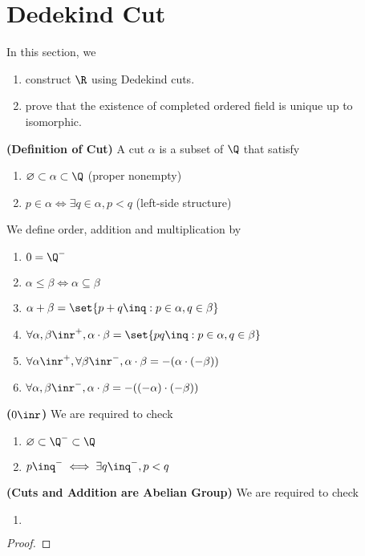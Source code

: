 \documentclass{report}
\begin{document}
\section{Dedekind Cut}
\begin{mdframed}
In this section, we  
\begin{enumerate}[label=(\alph*)]
  \item construct $\R$ using Dedekind cuts.   
  \item prove that the existence of completed ordered field is unique up to isomorphic. 
\end{enumerate}
\end{mdframed}
\begin{definition}
\textbf{(Definition of Cut)} A cut $\alpha $ is a subset of $\Q$ that satisfy 
\begin{enumerate}[label=(\alph*)]
  \item $\varnothing \subset \alpha \subset \Q$ (proper nonempty)
  \item  $p\in \alpha \iff  \exists q \in \alpha ,p<q$ (left-side structure)
\end{enumerate}
We define order, addition and multiplication by 
\begin{enumerate}[label=(\alph*)]
  \item $0=\Q^-$
  \item $\alpha \leq \beta \iff \alpha \subseteq \beta$ 
  \item $\alpha +\beta =\set{p+q\inq: p\in  \alpha ,q \in \beta }$ 
  \item $\forall \alpha ,\beta\inr^+,\alpha \cdot \beta=\set{pq\inq:p\in \alpha ,q\in \beta } $ 
  \item $\forall \alpha \inr^+,\forall \beta \inr^-, \alpha \cdot \beta = - (\alpha \cdot (-\beta ))$
  \item $\forall \alpha ,\beta \inr^-, \alpha \cdot \beta  =-((-\alpha )\cdot (-\beta ))$
\end{enumerate}
\end{definition}
\begin{theorem}
\textbf{($0\inr$)} We are required to check 
\begin{enumerate}[label=(\alph*)]
  \item $\varnothing \subset \Q^-\subset \Q$ 
  \item $p\inq^- \iff  \exists q\inq^-,p<q$
\end{enumerate}
\end{theorem}
\begin{theorem}
\textbf{(Cuts and Addition are Abelian Group)} We are required to check 
\begin{enumerate}[label=(\alph*)]
  \item $$
\end{enumerate}
\end{theorem}
\begin{proof}

\end{proof}
\end{document}
